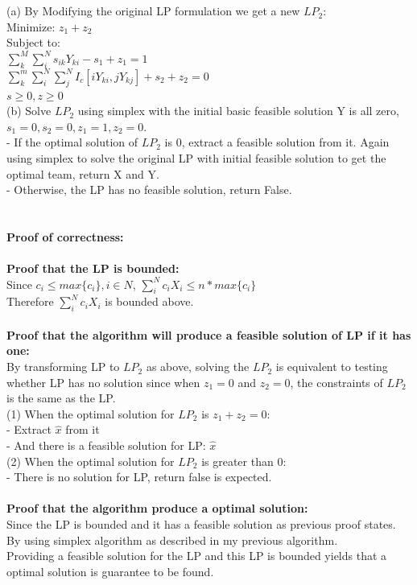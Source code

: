 \documentclass[10pt]{article}
\begin{document}
\begin{mdframed}
    \\
    \\(a) By Modifying the original LP formulation we get a new $LP_2$:
    \\Minimize: $z_1 + z_2$
    \\Subject to:
    \\$\sum_k^M\sum_i^N s_{ik}Y_{ki} - s_1 + z_1= 1$
    \\$\sum_k^m\sum_i^N\sum_j^N I_c[iY_{ki}, jY_{kj}] + s_2 + z_2= 0$
    \\$s \geq 0, z \geq 0$
    \\(b) Solve $LP_2$ using simplex with the initial basic feasible solution Y is all zero, $s_1 = 0, s_2 = 0, z_1 = 1, z_2 = 0$.
    \\- If the optimal solution of $LP_2$ is 0, extract a feasible solution  from it. Again using simplex to solve the original LP with initial feasible solution  to get the optimal team, return X and Y.
    \\- Otherwise, the LP has no feasible solution, return False.
    \\
    \\
    \\
    \textbf{Proof of correctness:}
    \\
    \\
    \textbf{Proof that the LP is bounded:}
    \\Since $c_i \leq max\{c_i\},i \in N$, $\sum_{i}^N c_i X_i \leq n*max\{c_i\}$
    \\Therefore $\sum_{i}^N c_i X_i$ is bounded above.
    \\
    \\
    \textbf{Proof that the algorithm will produce a feasible solution of LP if it has one:}
    \\By transforming LP to $LP_2$ as above, solving the $LP_2$ is equivalent to testing whether LP has no solution since when $z_1 = 0$ and $z_2 = 0$, the constraints of $LP_2$ is the same as the LP.
    \\(1) When the optimal solution for $LP_2$ is $z_1 + z_2 = 0$:
    \\- Extract $\hat{x}$ from it
    \\- And there is a feasible solution for LP: $\hat{x}$
    \\(2) When the optimal solution for $LP_2$ is greater than 0:
    \\- There is no solution for LP, return false is expected.
    \\
    \\\textbf{Proof that the algorithm produce a optimal solution:}
    \\Since the LP is bounded and it has a feasible solution as previous proof states.
    \\By using simplex algorithm as described in my previous algorithm. 
    \\Providing a feasible solution for the LP and this LP is bounded yields that a optimal solution is guarantee to be found.
    
    
    \end{mdframed}
\end{document}
